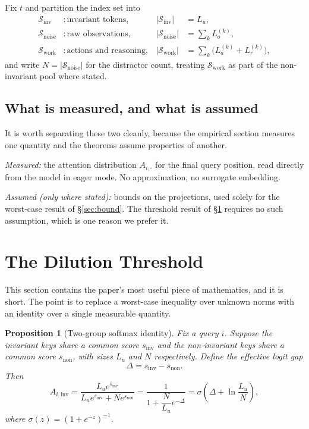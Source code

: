 \documentclass[11pt,a4paper]{article}
\theoremstyle{plain}
\newtheorem{proposition}{Proposition}
\theoremstyle{definition}
\theoremstyle{remark}
\newcommand{\Sinv}{\mathcal{S}_{\mathrm{inv}}}
\newcommand{\Snoise}{\mathcal{S}_{\mathrm{noise}}}
\newcommand{\Swork}{\mathcal{S}_{\mathrm{work}}}
\newcommand{\Ainv}{A_{i,\mathrm{inv}}}
\begin{document}
Fix $t$ and partition the index set into
\begin{align}
  \Sinv &: \text{invariant tokens}, & |\Sinv| &= L_u, \\
  \Snoise &: \text{raw observations}, & |\Snoise| &= \textstyle\sum_k L_o^{(k)}, \\
  \Swork &: \text{actions and reasoning}, & |\Swork| &= \textstyle\sum_k \bigl(L_a^{(k)}+L_r^{(k)}\bigr),
\end{align}
and write $N = |\Snoise|$ for the distractor count, treating $\Swork$ as part of
the non-invariant pool where stated.

\subsection{What is measured, and what is assumed}

It is worth separating these two cleanly, because the empirical section
measures one quantity and the theorems assume properties of another.

\emph{Measured:} the attention distribution $A_{i,\cdot}$ for the final query
position, read directly from the model in eager mode. No approximation, no
surrogate embedding.

\emph{Assumed (only where stated):} bounds on the projections, used solely for
the worst-case result of \S\ref{sec:bound}. The threshold result of
\S\ref{sec:threshold} requires no such assumption, which is one reason we prefer
it.

\section{The Dilution Threshold}
\label{sec:threshold}

This section contains the paper's most useful piece of mathematics, and it is
short. The point is to replace a worst-case inequality over unknown norms with
an identity over a single measurable quantity.

\begin{proposition}[Two-group softmax identity]
\label{prop:identity}
Fix a query $i$. Suppose the invariant keys share a common score
$s_{\mathrm{inv}}$ and the non-invariant keys share a common score
$s_{\mathrm{non}}$, with sizes $L_u$ and $N$ respectively. Define the
\emph{effective logit gap}
\begin{equation}
  \Delta = s_{\mathrm{inv}} - s_{\mathrm{non}} .
\end{equation}
Then
\begin{equation}
  \Ainv
  = \frac{L_u e^{s_{\mathrm{inv}}}}{L_u e^{s_{\mathrm{inv}}} + N e^{s_{\mathrm{non}}}}
  = \frac{1}{1 + \dfrac{N}{L_u}e^{-\Delta}}
  = \sigma\!\left(\Delta + \ln\frac{L_u}{N}\right),
  \label{eq:threshold}
\end{equation}
where $\sigma(z) = (1+e^{-z})^{-1}$.
\end{proposition}
\end{document}
